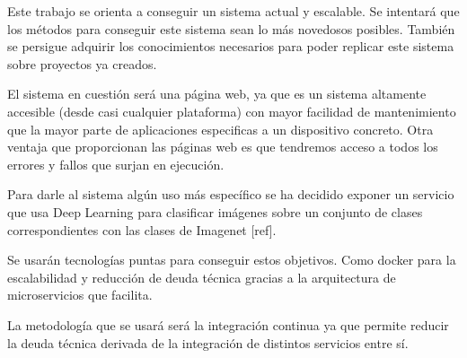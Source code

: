 
Este trabajo se orienta a conseguir un sistema actual y escalable. Se intentará que los métodos para conseguir este sistema sean lo más novedosos posibles. También se persigue adquirir los conocimientos necesarios para poder replicar este sistema sobre proyectos ya creados.

El sistema en cuestión será una página web, ya que es un sistema altamente accesible (desde casi cualquier plataforma) con mayor facilidad de mantenimiento que la mayor parte de aplicaciones especificas a un dispositivo concreto. Otra ventaja que proporcionan las páginas web es que tendremos acceso a todos los errores y fallos que surjan en ejecución.

Para darle al sistema algún uso más específico se ha decidido exponer un servicio que usa Deep Learning para clasificar imágenes sobre un conjunto de clases correspondientes con las clases de Imagenet [ref].

Se usarán tecnologías puntas para conseguir estos objetivos. Como docker para la escalabilidad y reducción de deuda técnica gracias a la arquitectura de microservicios que facilita.

La metodología que se usará será la integración continua ya que permite reducir la deuda técnica derivada de la integración de distintos servicios entre sí. 